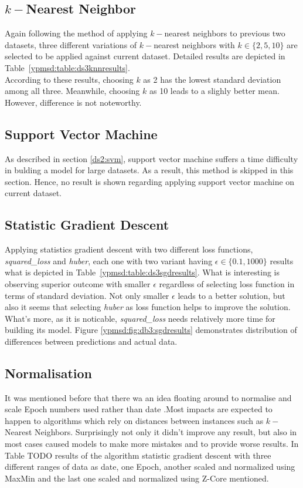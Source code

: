 \subsection{$k-$Nearest Neighbor}

Again following the method of applying $k-$nearest neighbors to previous two
datasets, three different variations of $k-$nearest neighbors with
$k\in\{2, 5, 10\}$ are selected to be applied against current dataset. Detailed
results are depicted in Table~\ref{ypmsd:table:ds3knnresults}.\\
According to these results, choosing $k$ as 2 has the lowest standard deviation
among all three. Meanwhile, choosing $k$ as 10 leads to a slighly better mean.
However, difference is not noteworthy.


\subsection{Support Vector Machine}

As described in section \ref{ds2:svm}, support vector machine suffers a time
difficulty in bulding a model for large datasets. As a result, this method is skipped in
this section. Hence, no result is shown regarding applying support vector
machine on current dataset.

\subsection{Statistic Gradient Descent}

Applying statistics gradient descent with two different loss functions, {\it
squared\_loss} and {\it huber}, each one with two variant having $\epsilon \in
\{0.1, 1000\}$ results what is depicted in
Table~\ref{ypmsd:table:ds3sgdresults}. What is interesting is observing superior
outcome with smaller $\epsilon$ regardless of selecting loss function in terms
of standard deviation. Not only smaller $\epsilon$ leads to a better solution,
but also it seems that selecting {\it huber} as loss function helps to improve
the solution.
What's more, as it is noticable, {\it squared\_loss} needs relatively more time
for building its model. Figure \ref{ypmsd:fig:db3:sgdresults} demonstrates distribution of differences between predictions and actual data.







\subsection{Normalisation}
It was mentioned before that there wa an idea floating around to normalise
and scale Epoch numbers used rather than date .Most impacts are
expected to happen to algorithms which rely on distances between instances such
as $k-$Nearest Neighbors. Surprisingly not only it didn't
improve any result, but also in most cases caused models to make more mistakes
and to provide worse results. In Table TODO results of the algorithm
statistic gradient descent with three different ranges of data as date, one Epoch, another
scaled and normalized using MaxMin and the last one scaled and normalized using
Z-Core mentioned.

